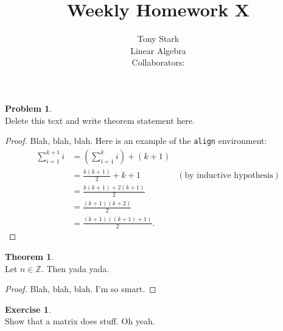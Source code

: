 \documentclass[12 pt]{article}
\theoremstyle{definition}
\newtheorem*{thm}{Theorem}
\newtheorem*{prob}{Problem}
\newtheorem*{ex}{Exercise}
\newcommand{\Z}{\mathbb{Z}}
\begin{document}
 
 
\title{Weekly Homework X}%
\author{Tony Stark\\ %
Linear Algebra\\
Collaborators: } %
 
\maketitle
 
\begin{prob}{1}\\ %
Delete this text and write theorem statement here.
\end{prob}


\begin{proof}
Blah, blah, blah.  Here is an example of the \texttt{align} environment:
\begin{align*}
\sum_{i=1}^{k+1}i & = \left(\sum_{i=1}^{k}i\right) +(k+1)\\ 
& = \frac{k(k+1)}{2}+k+1 & (\text{by inductive hypothesis})\\
& = \frac{k(k+1)+2(k+1)}{2}\\
& = \frac{(k+1)(k+2)}{2}\\
& = \frac{(k+1)((k+1)+1)}{2}.
\end{align*}
\end{proof}
 
\begin{thm}{2}\\
Let $n\in \Z$.  Then yada yada.
\end{thm}
 
\begin{proof}
Blah, blah, blah.  I'm so smart.
\end{proof}

\begin{ex}{3}\\
Show that a matrix does stuff. Oh yeah.
\end{ex}
\end{document}
